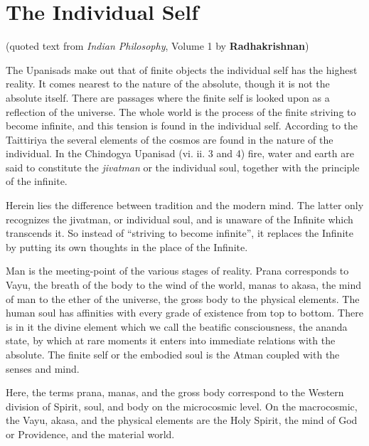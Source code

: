\section{The Individual Self}

(quoted text from \emph{Indian Philosophy}, Volume 1 by \textbf{Radhakrishnan})


\begin{quotex}
The Upanisads make out that of finite objects the individual self has the highest reality. It comes nearest to the nature of the absolute, though it is not the absolute itself. There are passages where the finite self is looked upon as a reflection of the universe. The whole world is the process of the finite striving to become infinite, and this tension is found in the individual self. According to the Taittiriya the several elements of the cosmos are found in the nature of the individual. In the Chindogya Upanisad (vi. ii. 3 and 4) fire, water and earth are said to constitute the \emph{jivatman} or the individual soul, together with the principle of the infinite.
\end{quotex}


Herein lies the difference between tradition and the modern mind. The latter only recognizes the jivatman, or individual soul, and is unaware of the Infinite which transcends it. So instead of ``striving to become infinite'', it replaces the Infinite by putting its own thoughts in the place of the Infinite.

\begin{quotex}
Man is the meeting-point of the various stages of reality. Prana corresponds to Vayu, the breath of the body to the wind of the world, manas to akasa, the mind of man to the ether of the universe, the gross body to the physical elements. The human soul has affinities with every grade of existence from top to bottom. There is in it the divine element which we call the beatific consciousness, the ananda state, by which at rare moments it enters into immediate relations with the absolute. The finite self or the embodied soul is the Atman coupled with the senses and mind.
\end{quotex}

Here, the terms prana, manas, and the gross body correspond to the Western division of Spirit, soul, and body on the microcosmic level. On the macrocosmic, the Vayu, akasa, and the physical elements are the Holy Spirit, the mind of God or Providence, and the material world.

